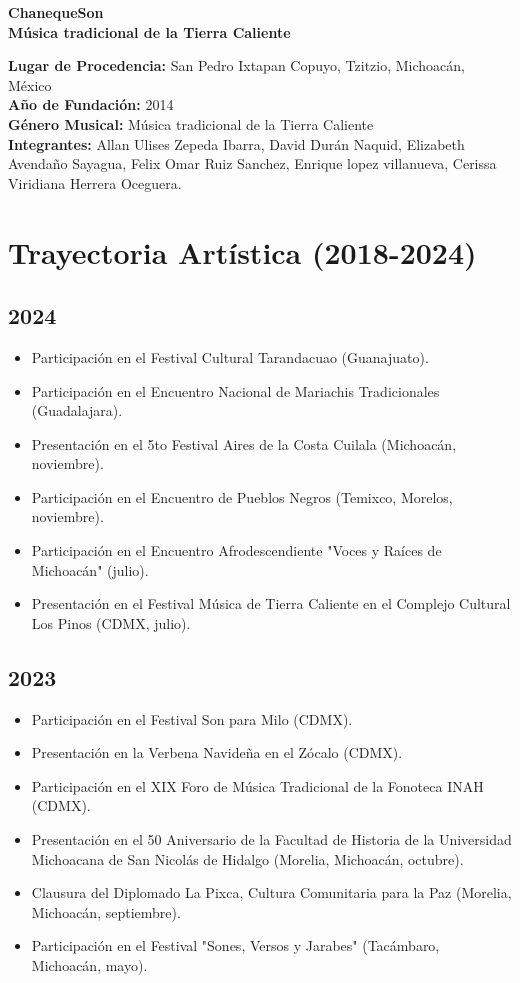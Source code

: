 \documentclass{article}
\begin{document}
\begin{center}
    \textbf{\Large ChanequeSon} \\
    \textbf{\large Música tradicional de la Tierra Caliente}
\end{center}

\textbf{Lugar de Procedencia:} San Pedro Ixtapan Copuyo, Tzitzio, Michoacán, México \\
\textbf{Año de Fundación:} 2014 \\
\textbf{Género Musical:} Música tradicional de la Tierra Caliente \\
\textbf{Integrantes:} Allan Ulises Zepeda Ibarra, David Durán Naquid, Elizabeth Avendaño Sayagua, Felix Omar Ruiz Sanchez, Enrique lopez villanueva, Cerissa Viridiana Herrera Oceguera.

\section*{Trayectoria Artística (2018-2024)}

\subsection*{2024}
\begin{itemize}[leftmargin=*]
    \item Participación en el Festival Cultural Tarandacuao (Guanajuato).
    \item Participación en el Encuentro Nacional de Mariachis Tradicionales (Guadalajara).
    \item Presentación en el 5to Festival Aires de la Costa Cuilala (Michoacán, noviembre).
    \item Participación en el Encuentro de Pueblos Negros (Temixco, Morelos, noviembre).
    \item Participación en el Encuentro Afrodescendiente "Voces y Raíces de Michoacán" (julio).
    \item Presentación en el Festival Música de Tierra Caliente en el Complejo Cultural Los Pinos (CDMX, julio).
\end{itemize}

\subsection*{2023}
\begin{itemize}[leftmargin=*]
    \item Participación en el Festival Son para Milo (CDMX).
    \item Presentación en la Verbena Navideña en el Zócalo (CDMX).
    \item Participación en el XIX Foro de Música Tradicional de la Fonoteca INAH (CDMX).
    \item Presentación en el 50 Aniversario de la Facultad de Historia de la Universidad Michoacana de San Nicolás de Hidalgo (Morelia, Michoacán, octubre).
    \item Clausura del Diplomado La Pixca, Cultura Comunitaria para la Paz (Morelia, Michoacán, septiembre).
    \item Participación en el Festival "Sones, Versos y Jarabes" (Tacámbaro, Michoacán, mayo).
\end{itemize}
\end{document}
